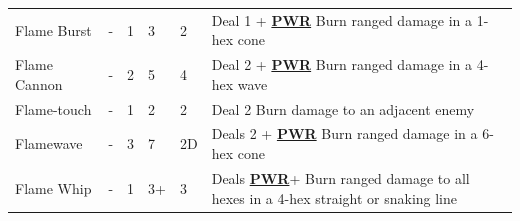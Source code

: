 \documentclass[12pt]{article}
\newcommand{\refto}[1]{\hyperlink{#1}{\textbf{#1}}}
\begin{document}
\begin{center}
\begin{tabularx}{\textwidth}{p{}p{}p{}p{}p{}p{}}
Flame Burst & - & 1 & 3 & 2 & Deal 1 + \refto{PWR} Burn ranged damage in a 1-hex cone \\
Flame Cannon & - & 2 & 5 & 4 & Deal 2 +  \refto{PWR} Burn ranged damage in a 4-hex wave\\
Flame-\newline touch & - & 1 & 2 & 2 & Deal 2 Burn damage to an adjacent enemy \\
Flamewave & - & 3 & 7 & 2D & Deals 2 + \refto{PWR} Burn ranged damage in a 6-hex cone\\
Flame Whip & - & 1 & 3+ & 3 & Deals \refto{PWR}+ Burn ranged damage to all hexes in a 4-hex straight or snaking line \\
\hline
\end{tabularx}
\end{center}

\pagebreak
\end{document}

